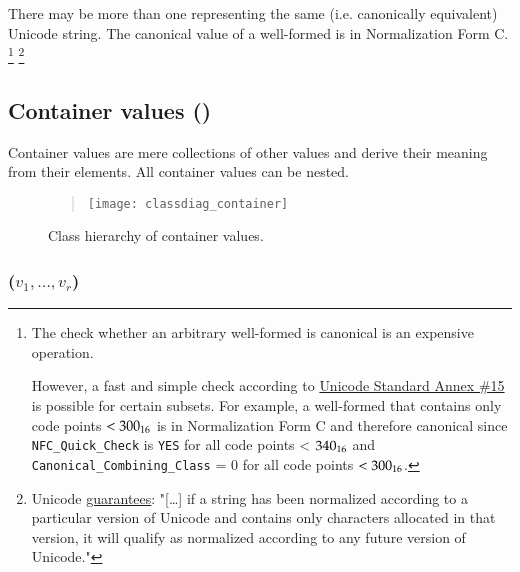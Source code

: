 There may be more than one \DborUtfEightStringValue{} representing the same (i.e. canonically equivalent)
Unicode string.
The canonical value of a well-formed \DborUtfEightStringValue{} is in Normalization Form C.%
\footnote{
    The check whether an arbitrary well-formed \DborUtfEightStringValue{} is canonical is an expensive operation.

    However, a fast and simple check according to
    \href{https://unicode.org/reports/tr15/\#Detecting_Normalization_Forms}{Unicode Standard Annex \#15}
    is possible for certain subsets.
    For example, a well-formed \DborUtfEightStringValue{} that contains only code points $< \mathrm{300}_{16}$ is
    in Normalization Form C and therefore canonical
    since \texttt{NFC\_Quick\_Check} is \texttt{YES} for all code points < $\mathrm{340}_{16}$ and
    \texttt{Canonical\_Combining\_Class} = 0 for all code points $< \mathrm{300}_{16}$.
}%
\footnote{%
  Unicode \href{https://unicode.org/reports/tr15/\#Stability_of_Normalized_Forms}{guarantees}:
  "[\dots] if a string has been normalized according to a particular version of Unicode and contains only
  characters allocated in that version, it will qualify as normalized according to any future version of Unicode."
}


\subsection{Container values (\DborContainerValue)}
\label{sec:containervalues}
\hypertarget{sec:def:ContainerValue}{}

Container values are mere collections of other values and derive their meaning from their elements.
All container values can be nested.

\begin{figure}[H]
    \begin{quote}
        \noindent
        \texttt{[image: classdiag\_container]}%
        \caption{Class hierarchy of container values.}
        \label{fig:class:ContainerValue}
    \end{quote}
\end{figure}


\subsubsection{\DborSequenceValue(\texorpdfstring{$v_1, \ldots, v_r$}{v1, ...m vr})}
\hypertarget{sec:def:SequenceValue}{}

